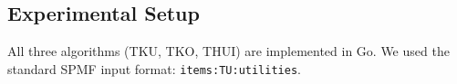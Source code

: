 \subsection{Experimental Setup}

All three algorithms (TKU, TKO, THUI) are implemented in Go. We used the standard SPMF input format: \texttt{items:TU:utilities}.